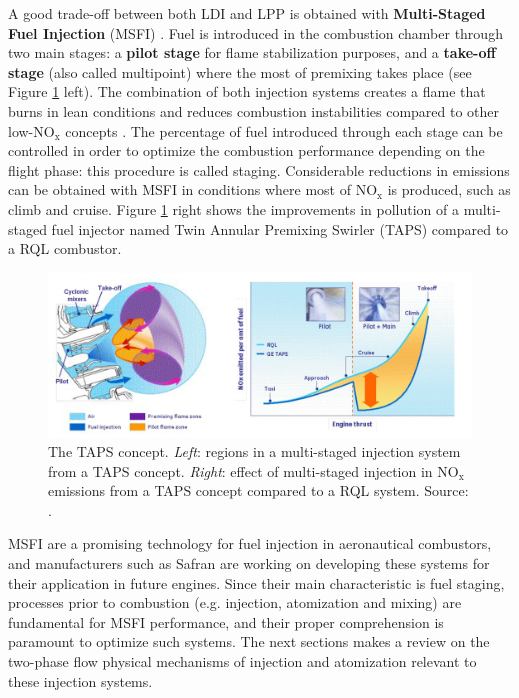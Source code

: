 A good trade-off between both LDI and LPP is obtained with \textbf{Multi-Staged Fuel Injection} (MSFI) . Fuel is introduced in the combustion chamber through two main stages: a \textbf{pilot stage} for flame stabilization purposes, and a \textbf{take-off stage} (also called multipoint) where the most of premixing takes place (see Figure \ref{fig:foust_TAPS} left). The combination of both injection systems creates a flame that burns in lean conditions and reduces combustion instabilities compared to other low-NO$_\mathrm{x}$ concepts . The percentage of fuel introduced through each stage can be controlled in order to optimize the combustion performance depending on the flight phase: this procedure is called staging. Considerable reductions in emissions can be obtained with MSFI in conditions where most of NO$_\mathrm{x}$ is produced, such as climb and cruise. Figure \ref{fig:foust_TAPS} right shows the improvements in pollution of a multi-staged fuel injector named Twin Annular Premixing Swirler (TAPS)  compared to a RQL combustor.

\begin{figure}[h!]
	\centering
	\includegraphics[scale=0.5]{./part0_intro/foust_TAPS}
	\caption[The TAPS concept]{The TAPS concept. \textsl{Left}: regions in a multi-staged injection system from a TAPS concept. \textsl{Right}: effect of multi-staged injection in NO$_\mathrm{x}$ emissions from a TAPS concept compared to a RQL system. Source: .}
	\label{fig:foust_TAPS}
\end{figure}

MSFI are a promising technology for fuel injection in aeronautical combustors, and manufacturers such as Safran are working on developing these systems for their application in future engines. Since their main characteristic is fuel staging, processes prior to combustion (e.g. injection, atomization and mixing) are fundamental for MSFI performance, and their proper comprehension is paramount to optimize such systems. The next sections makes a review on the two-phase flow physical mechanisms of injection and atomization relevant to these injection systems.


